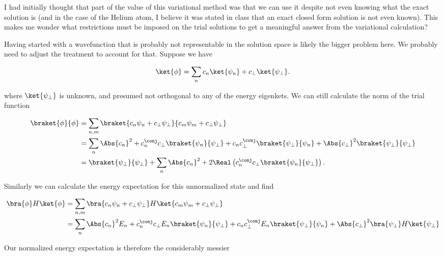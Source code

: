 I had initially thought that part of the value of this variational method was that we can use it despite not even knowing what the exact solution is (and in the case of the Helium atom, I believe it was stated in class that an exact closed form solution is not even known).  This makes me wonder what restrictions must be imposed on the trial solutions to get a meaningful answer from the variational calculation?

Having started with a wavefunction that is probably not representable in the solution space is likely the bigger problem here.  We probably need to adjust the treatment to account for that.  Suppose we have

\begin{equation}\label{eqn:variationHarmonicOscillator:270}
\ket{\phi} = \sum_n c_n \ket{\psi_n} + c_\perp \ket{\psi_\perp}.
\end{equation}

where $\ket{\psi_\perp}$ is unknown, and presumed not orthogonal to any of the energy eigenkets.  We can still calculate the norm of the trial function

\begin{align*}
\braket{\phi}{\phi}
&=
\sum_{n,m} \braket{ c_n \psi_n + c_\perp \psi_\perp}{ c_m \psi_m + c_\perp \psi_\perp} \\
&=
\sum_n \Abs{c_n}^2 
+ c_n^\conj c_\perp 
\braket{\psi_n}{\psi_\perp}
+ c_n c_\perp^\conj \braket{\psi_\perp}{\psi_n}
+ \Abs{c_\perp}^2
\braket{\psi_\perp}{\psi_\perp} \\
&=
\braket{\psi_\perp}{\psi_\perp} +
\sum_n \Abs{c_n}^2 + 2 \Real \left(c_n^\conj c_\perp \braket{\psi_n}{\psi_\perp} \right).
\end{align*}

Similarly we can calculate the energy expectation for this unnormalized state and find

\begin{align*}
\bra{\phi} H \ket{\phi}
&=
\sum_{n,m} \bra{ c_n \psi_n + c_\perp \psi_\perp} H \ket{ c_m \psi_m + c_\perp \psi_\perp} \\
&=
\sum_n \Abs{c_n}^2 E_n
+ c_n^\conj c_\perp E_n
\braket{\psi_n}{\psi_\perp}
+ c_n c_\perp^\conj E_n \braket{\psi_\perp}{\psi_n}
+ \Abs{c_\perp}^2
\bra{\psi_\perp} H \ket{\psi_\perp} 
\end{align*}

Our normalized energy expectation is therefore the considerably messier

